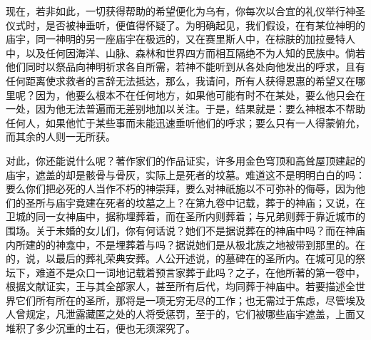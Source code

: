 现在，若非如此，一切获得帮助的希望便化为乌有，你每次以合宜的礼仪举行神圣仪式时，是否被神垂听，便值得怀疑了。为明确起见，我们假设，在有某位神明的庙宇，同一神明的另一座庙宇在极远的，又在赛里斯人中，在棕肤的加拉曼特人中，以及任何因海洋、山脉、森林和世界四方而相互隔绝不为人知的民族中。倘若他们同时以祭品向神明祈求各自所需，若神不能听到从各处向他发出的呼求，且有任何距离使求救者的言辞无法抵达，那么，我请问，所有人获得恩惠的希望又在哪里呢？因为，他要么根本不在任何地方，如果他可能有时不在某处，要么他只会在一处，因为他无法普遍而无差别地加以关注。于是，结果就是：要么神根本不帮助任何人，如果他忙于某些事而未能迅速垂听他们的呼求；要么只有一人得蒙俯允，而其余的人则一无所获。\par

对此，你还能说什么呢？著作家们的作品证实，许多用金色穹顶和高耸屋顶建起的庙宇，遮盖的却是骸骨与骨灰，实际上是死者的坟墓。难道这不是明明白白的吗：要么你们把必死的人当作不朽的神崇拜，要么对神祇施以不可弥补的侮辱，因为他们的圣所与庙宇竟建在死者的坟墓之上？在第九卷中记载，葬于的神庙；又说，在卫城的同一女神庙中，据称埋葬着，而在圣所内则葬着；与兄弟则葬于靠近城市的围场。关于未婚的女儿们，你有何话说？她们不是据说葬在的神庙中吗？而在神庙内所建的的神龛中，不是埋葬着与吗？据说她们是从极北族之地被带到那里的。在的，说，以最后的葬礼荣典安葬。人公开述说，的墓碑在的圣所内。在城可见的祭坛下，难道不是众口一词地记载着预言家葬于此吗？之子，在他所著的第一卷中，根据文献证实，王与其全部家人，甚至所有后代，均同葬于神庙中。若要描述全世界它们所有所在的圣所，那将是一项无穷无尽的工作；也无需过于焦虑，尽管埃及人曾规定，凡泄露藏匿之处的人将受惩罚，至于的，它们被哪些庙宇遮盖，上面又堆积了多少沉重的土石，便也无须深究了。\par

